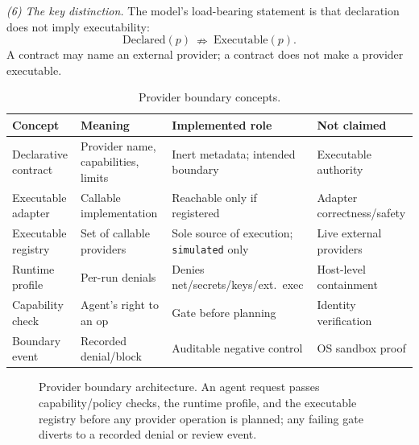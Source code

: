 \documentclass[conference]{IEEEtran}
\newcommand{\code}[1]{\texttt{\small #1}}
\begin{document}
\emph{(6) The key distinction.} The model's load-bearing statement is that declaration does
not imply executability:
\[
\mathrm{Declared}(p)\ \nRightarrow\ \mathrm{Executable}(p).
\]
A contract may name an external provider; a contract does not make a provider executable.

\begin{table}[t]
\centering
\caption{Provider boundary concepts.}
\label{tab:concepts}
\renewcommand{\arraystretch}{1.25}
\scriptsize
\setlength{\tabcolsep}{3pt}
\begin{tabular}{@{}L{0.17\columnwidth}L{0.24\columnwidth}L{0.24\columnwidth}L{0.21\columnwidth}@{}}
\toprule
\textbf{Concept} & \textbf{Meaning} & \textbf{Implemented role} & \textbf{Not claimed} \\
\midrule
Declarative contract & Provider name, capabilities, limits & Inert metadata; intended boundary & Executable authority \\
Executable adapter & Callable implementation & Reachable only if registered & Adapter correctness/safety \\
Executable registry & Set of callable providers & Sole source of execution; \code{simulated} only & Live external providers \\
Runtime profile & Per-run denials & Denies net/secrets/keys/ext.\ exec & Host-level containment \\
Capability check & Agent's right to an op & Gate before planning & Identity verification \\
Boundary event & Recorded denial/block & Auditable negative control & OS sandbox proof \\
\bottomrule
\end{tabular}
\end{table}

\begin{figure}[t]
\centering
{}
\caption{Provider boundary architecture. An agent request passes capability/policy checks,
the runtime profile, and the executable registry before any provider operation is planned;
any failing gate diverts to a recorded denial or review event.}
\label{fig:arch}
\end{figure}
\end{document}
